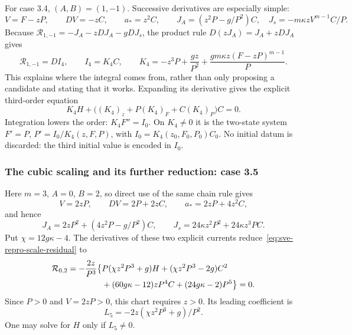 For case 3.4, $(A,B)=(1,-1)$. Successive derivatives are especially simple:
\[
 V=F-zP,\qquad DV=-zC,\qquad a_*=z^2C,
 \qquad J_A=(z^2P-g/P^2)C,\quad
 J_s=-m\kappa zV^{m-1}C/P.
\]
Because $\mathcal R_{1,-1}=-J_A-zDJ_A-gDJ_s$, the product rule
$D(zJ_A)=J_A+zDJ_A$ gives
\begin{equation}
 \mathcal R_{1,-1}=D I_4,\qquad
 I_4=K_4 C,\qquad
 K_4=-z^3P+\frac{gz}{P^2}
                 +\frac{gm\kappa z(F-zP)^{m-1}}P.
 \label{eq:sve-repro-first-integral}
\end{equation}
This explains where the integral comes from, rather than only proposing
a candidate and stating that it works. Expanding its derivative gives
the explicit third-order equation
\begin{equation}
 K_4H+\big((K_4)_z+P(K_4)_F+C(K_4)_P\big)C=0.
 \label{eq:sve-common-expanded}
\end{equation}
Integration lowers the order: $K_4F''=I_0$. On $K_4\ne0$ it is the
two-state system $F'=P$, $P'=I_0/K_4(z,F,P)$, with
$I_0=K_4(z_0,F_0,P_0)C_0$. No initial datum is discarded: the third
initial value is encoded in $I_0$.

\subsubsection{The cubic scaling and its further reduction: case 3.5}
Here $m=3$, $A=0$, $B=2$, so direct use of the same chain rule gives
\[
 V=2zP,\qquad DV=2P+2zC,\qquad a_*=2zP+4z^2C,
\]
and hence
\[
 J_A=2zP^2+(4z^2P-g/P^2)C,\qquad
 J_s=24\kappa z^2P^2+24\kappa z^3PC.
\]
Put $\chi=12g\kappa-4$. The derivatives of these two explicit
currents reduce~\eqref{eq:sve-repro-scale-residual} to
\begin{align}
 \mathcal R_{0,2}=-\frac{2z}{P^3}\big\{&
    P(\chi z^2P^3+g)H+(\chi z^2P^3-2g)C^2\notag\\
    &+(60g\kappa-12)zP^4C+(24g\kappa-2)P^5\big\}=0.
 \label{eq:sve-cubic-expanded}
\end{align}
Since $P>0$ and $V=2zP>0$, this
chart requires $z>0$. Its leading coefficient is
\[
 L_5=-2z(\chi z^2P^3+g)/P^2.
\]
One may solve for $H$ only if $L_5\ne0$.

